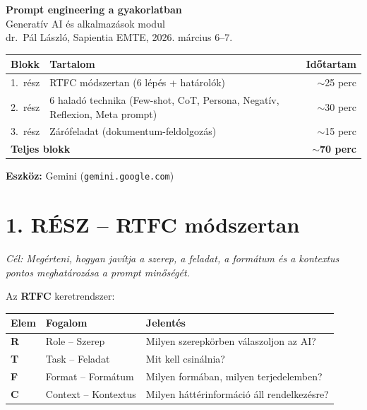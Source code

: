 \documentclass[11pt,a4paper]{article}
\begin{document}
\thispagestyle{empty}
\begin{center}
  {\LARGE\bfseries Prompt engineering a gyakorlatban}\\[5pt]
  {\normalsize Generatív AI és alkalmazások modul}\\[1pt]
  {\small\color{medgray} dr.\ Pál László, Sapientia EMTE, 2026. március 6--7.}
\end{center}

\vspace{10pt}
\noindent
\begin{tabularx}{\linewidth}{lXr}
\toprule
\textbf{Blokk} & \textbf{Tartalom} & \textbf{Időtartam} \\
\midrule
1.\ rész & RTFC módszertan (6 lépés + határolók) & $\sim$25 perc \\
2.\ rész & 6 haladó technika (Few-shot, CoT, Persona, Negatív, Reflexion, Meta prompt) & $\sim$30 perc \\
3.\ rész & Zárófeladat (dokumentum-feldolgozás) & $\sim$15 perc \\
\midrule
\multicolumn{2}{l}{\textbf{Teljes blokk}} & \textbf{$\sim$70 perc} \\
\bottomrule
\end{tabularx}

\smallskip
\noindent\textbf{Eszköz:} Gemini (\texttt{gemini.google.com})

\vspace{8pt}

\section{1. RÉSZ -- RTFC módszertan}

\noindent\textit{Cél: Megérteni, hogyan javítja a szerep, a feladat, a formátum és a kontextus pontos meghatározása a prompt minőségét.}

\bigskip
\noindent Az \textbf{RTFC} keretrendszer:
\smallskip

\begin{tabularx}{\linewidth}{@{}llX@{}}
\toprule
\textbf{Elem} & \textbf{Fogalom} & \textbf{Jelentés} \\
\midrule
\textbf{R} & Role -- Szerep    & Milyen szerepkörben válaszoljon az AI? \\
\textbf{T} & Task -- Feladat   & Mit kell csinálnia? \\
\textbf{F} & Format -- Formátum & Milyen formában, milyen terjedelemben? \\
\textbf{C} & Context -- Kontextus & Milyen háttérinformáció áll rendelkezésre? \\
\bottomrule
\end{tabularx}
\end{document}
